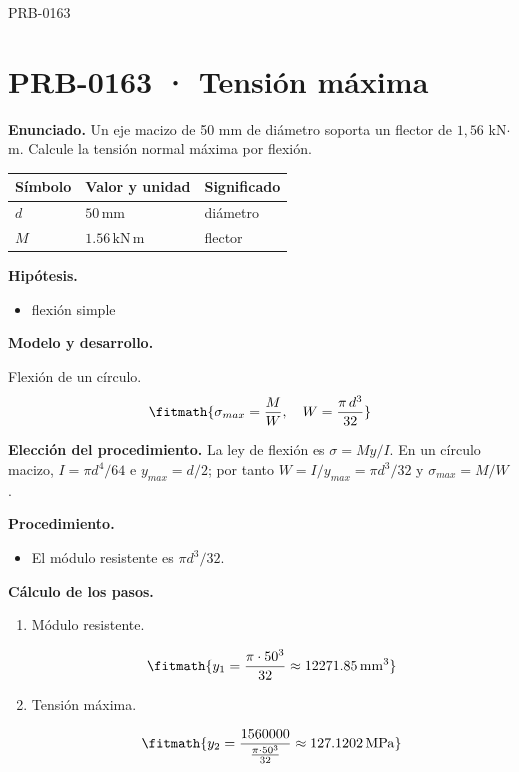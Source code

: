 \begin{studiumworked}{PRB-0163}

\section{PRB-0163 · Tensión máxima}

\textbf{Enunciado.} Un eje macizo de 50 mm de diámetro soporta un flector de $1{,}56$ kN$\cdot$m. Calcule la tensión normal máxima por flexión.

\par\medskip\noindent\begin{tabular}{@{}p{.18\linewidth}p{.26\linewidth}p{.48\linewidth}@{}}
\toprule Símbolo & Valor y unidad & Significado\\\midrule
$d$ & $50\,\mathrm{mm}$ & diámetro\\
$M$ & $1.56\,\mathrm{kN\,m}$ & flector\\
\bottomrule\end{tabular}\par\medskip

\textbf{Hipótesis.}\begin{itemize}\item flexión simple\end{itemize}

\textbf{Modelo y desarrollo.}

Flexión de un círculo.\[\fitmath{\sigma_{max} = \frac{M}{W},\quad W = \frac{\pi\,d^{3}}{32}}\]

\textbf{Elección del procedimiento.} La ley de flexión es $\sigma=My/I$. En un círculo macizo, $I=\pi d^4/64$ e $y_{max}=d/2$; por tanto $W=I/y_{max}=\pi d^3/32$ y $\sigma_{max}=M/W$.

\textbf{Procedimiento.}\begin{itemize}\item El módulo resistente es $\pi d^3/32$.\end{itemize}

\textbf{Cálculo de los pasos.}

\begin{enumerate}

\item Módulo resistente.

\[\fitmath{y_{1}=\frac{\pi\cdot {50}^{3}}{32}\approx 12271.85\,\mathrm{mm^{3}}}\]

\item Tensión máxima.

\[\fitmath{y_{2}=\frac{1560000}{\frac{\pi\cdot {50}^{3}}{32}}\approx 127.1202\,\mathrm{MPa}}\]


\end{enumerate}
\end{studiumworked}
